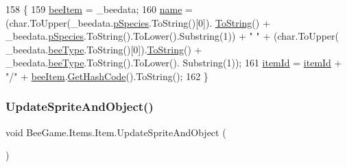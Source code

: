 \begin{DoxyCode}
158         \{
159             \hyperlink{struct_bee_game_1_1_items_1_1_item_a0593f3b7b3ff5daa864f3c6d0ccd77ca}{beeItem} = \_beedata;
160             \hyperlink{struct_bee_game_1_1_items_1_1_item_a0b0bd7eb510757f650f1be3d05b23fc8}{name} = (\textcolor{keywordtype}{char}.ToUpper(\_beedata.\hyperlink{struct_bee_game_1_1_bee_1_1_bee_data_a87db9add2bcc463ab444eb4ac7a4e228}{pSpecies}.ToString()[0]).
      \hyperlink{struct_bee_game_1_1_items_1_1_item_ac8039eff360bc9120180a54a0aaf13d8}{ToString}() + \_beedata.\hyperlink{struct_bee_game_1_1_bee_1_1_bee_data_a87db9add2bcc463ab444eb4ac7a4e228}{pSpecies}.ToString().ToLower().Substring(1)) + \textcolor{stringliteral}{" "} + (\textcolor{keywordtype}{char}.ToUpper(
      \_beedata.\hyperlink{struct_bee_game_1_1_bee_1_1_bee_data_acfb6e209ae7bd1b52928580fcce4c743}{beeType}.ToString()[0]).\hyperlink{struct_bee_game_1_1_items_1_1_item_ac8039eff360bc9120180a54a0aaf13d8}{ToString}() + \_beedata.\hyperlink{struct_bee_game_1_1_bee_1_1_bee_data_acfb6e209ae7bd1b52928580fcce4c743}{beeType}.ToString().ToLower().
      Substring(1));
161             \hyperlink{struct_bee_game_1_1_items_1_1_item_aa85bfeab893271c26f8ca41b638ada1c}{itemId} = \hyperlink{struct_bee_game_1_1_items_1_1_item_aa85bfeab893271c26f8ca41b638ada1c}{itemId} + \textcolor{stringliteral}{"/"} + \hyperlink{struct_bee_game_1_1_items_1_1_item_a0593f3b7b3ff5daa864f3c6d0ccd77ca}{beeItem}.\hyperlink{struct_bee_game_1_1_bee_1_1_bee_data_ab11b7e2d244cb0021c52ae0b839ff6c3}{GetHashCode}().ToString();
162         \}
\end{DoxyCode}
\mbox{\label{struct_bee_game_1_1_items_1_1_item_a29abdb5010a23262e7562720bb85c171}} 
\subsubsection{\texorpdfstring{Update\+Sprite\+And\+Object()}{UpdateSpriteAndObject()}}
{\footnotesize\ttfamily void Bee\+Game.\+Items.\+Item.\+Update\+Sprite\+And\+Object (\begin{DoxyParamCaption}{ }\end{DoxyParamCaption})}



